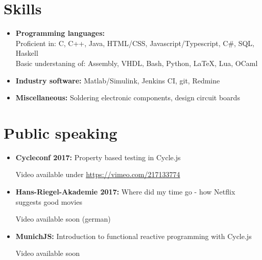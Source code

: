 \documentclass[11pt,a4paper,sans]{moderncv}        %
\begin{document}
\section{Skills}

\vspace{6pt}

\begin{itemize}

\item \textbf{Programming languages:}\\ Proficient in: C, C++, Java, HTML/CSS, Javascript/Typescript, C\#, SQL, Haskell \\ Basic understaning of: Assembly, VHDL, Bash, Python, LaTeX, Lua, OCaml

\vspace{6pt}

\item \textbf{Industry software:} Matlab/Simulink, Jenkins CI, git, Redmine

\vspace{6pt}

\item \textbf{Miscellaneous:} Soldering electronic components, design circuit boards

\end{itemize}

\section{Public speaking}

\vspace{6pt}

\begin{itemize}

\item{\textbf{Cycleconf 2017:} Property based testing in Cycle.js

    \small{Video available under \hyperlink{https://vimeo.com/217133774}{https://vimeo.com/217133774}}}

\vspace{6pt}

\item{\textbf{Hans-Riegel-Akademie 2017:} Where did my time go - how Netflix suggests good movies

    \small{Video available soon (german)}}

\item{\textbf{MunichJS:} Introduction to functional reactive programming with Cycle.js

    \small{Video available soon}}

\end{itemize}
\end{document}
